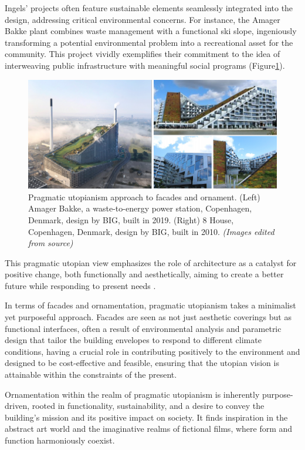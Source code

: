Ingels' projects often feature sustainable elements seamlessly integrated into the design, addressing critical environmental concerns.
For instance, the Amager Bakke plant combines waste management with a functional ski slope, ingeniously transforming a potential environmental problem into a recreational asset for the community.
This project vividly exemplifies their commitment to the idea of interweaving public infrastructure with meaningful social programs\cite{Ingels2015} (Figure\ref{fig:Pragmaticutopianism}).

     \begin{figure}[t]
          \centering
          \includegraphics[width= \linewidth]{Images/pragmaticutopianism}
          \caption{Pragmatic utopianism approach to facades and ornament. (Left) Amager Bakke, a waste-to-energy power station, Copenhagen, Denmark, design by BIG, built in 2019. (Right) 8 House, Copenhagen, Denmark, design by BIG, built in 2010. \textit{(Images edited from source)}}
          \label{fig:Pragmaticutopianism}
        \end{figure}


This pragmatic utopian view emphasizes the role of architecture as a catalyst for positive change, both functionally and aesthetically, aiming to create a better future while responding to present needs .

In terms of facades and ornamentation, pragmatic utopianism takes a minimalist yet purposeful approach.
Facades are seen as not just aesthetic coverings but as functional interfaces, often a result of environmental analysis and parametric design that tailor the building envelopes to respond to different climate conditions\cite{Ingels2015}, having a crucial role in contributing positively to the environment and designed to be cost-effective and feasible, ensuring that the utopian vision is attainable within the constraints of the present.

Ornamentation within the realm of pragmatic utopianism is inherently purpose-driven, rooted in functionality, sustainability, and a desire to convey the building's mission and its positive impact on society.
It finds inspiration in the abstract art world and the imaginative realms of fictional films, where form and function harmoniously coexist\cite{Stouhi2022}.

